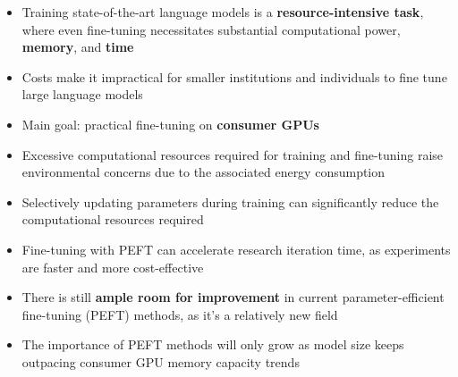\begin{itemize}
    \item Training state-of-the-art language models is a \textbf{resource-intensive task}, where even fine-tuning necessitates substantial computational power, \textbf{memory}, and \textbf{time}
    \item Costs make it impractical for smaller institutions and individuals to fine tune large language models
    \item Main goal: practical fine-tuning on \textbf{consumer GPUs}
    \item Excessive computational resources required for training and fine-tuning raise environmental concerns due to the associated energy consumption
    \item Selectively updating parameters during training can significantly reduce the computational resources required
    \item Fine-tuning with PEFT can accelerate research iteration time, as experiments are faster and more cost-effective
    \item There is still \textbf{ample room for improvement} in current parameter-efficient fine-tuning (PEFT) methods, as it's a relatively new field
    \item The importance of PEFT methods will only grow as model size keeps outpacing consumer GPU memory capacity trends
\end{itemize}
